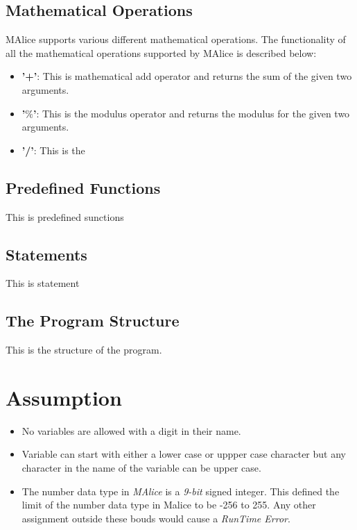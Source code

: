 \documentclass[a4wide, 11pt]{article}
\begin{document}
	\subsection{Mathematical Operations}
	\label{sec:mathOper}
		MAlice supports various different mathematical operations. The functionality of all the mathematical
		operations supported by MAlice is described below:
		\begin{itemize}
			\item {\bf '+'}: This is mathematical add operator and returns the sum of the given two arguments.
			\item {\bf '$\%$'}: This is the modulus operator and returns the modulus for the given two arguments.
			\item {\bf '/'}: This is the 
		\end{itemize}
 
	\subsection{Predefined Functions}
	\label{sec:preFunc}
	This is predefined sunctions

	\subsection{Statements}
	\label{sec:statements}
	This is statement

	\subsection{The Program Structure}
	\label{sec:progStr}
	This is the structure of the program.

	\section{Assumption}
	\label{sec:assumption}
	\begin{itemize}
		\item No variables are allowed with a digit in their name.
		\item	Variable can start with either a lower case or uppper case character but any character
					in the name of the variable can be upper case.
		\item The number data type in \emph{MAlice} is a \emph{9-bit} signed integer.
					This defined the limit of the number data type in Malice to be -256 to 255.
					Any other assignment outside these bouds would cause a \emph{RunTime Error}.
	\end{itemize}
\end{document}
